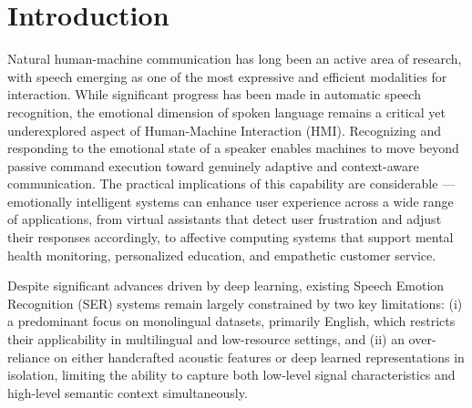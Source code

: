 \documentclass[iicol,sn-mathphys-num]{sn-jnl}%
\theoremstyle{thmstyleone}%
\theoremstyle{thmstyletwo}%
\theoremstyle{thmstylethree}%
\begin{document}



\maketitle

\section{Introduction}\label{sec1}


Natural human-machine communication has long been an active area of research, with speech emerging as one of the most expressive and efficient modalities for interaction. While significant progress has been made in automatic speech recognition, the emotional dimension of spoken language remains a critical yet underexplored aspect of Human-Machine Interaction (HMI). Recognizing and responding to the emotional state of a speaker enables machines to move beyond passive command execution toward genuinely adaptive and context-aware communication. The practical implications of this capability are considerable — emotionally intelligent systems can enhance user experience across a wide range of applications, from virtual assistants that detect user frustration and adjust their responses accordingly, to affective computing systems that support mental health monitoring, personalized education, and empathetic customer service.

Despite significant advances driven by deep learning, existing Speech Emotion Recognition (SER) systems remain largely constrained by two key limitations: (i) a predominant focus on monolingual datasets, primarily English, which restricts their applicability in multilingual and low-resource settings, and (ii) an over-reliance on either handcrafted acoustic features or deep learned representations in isolation, limiting the ability to capture both low-level signal characteristics and high-level semantic context simultaneously.
\end{document}
